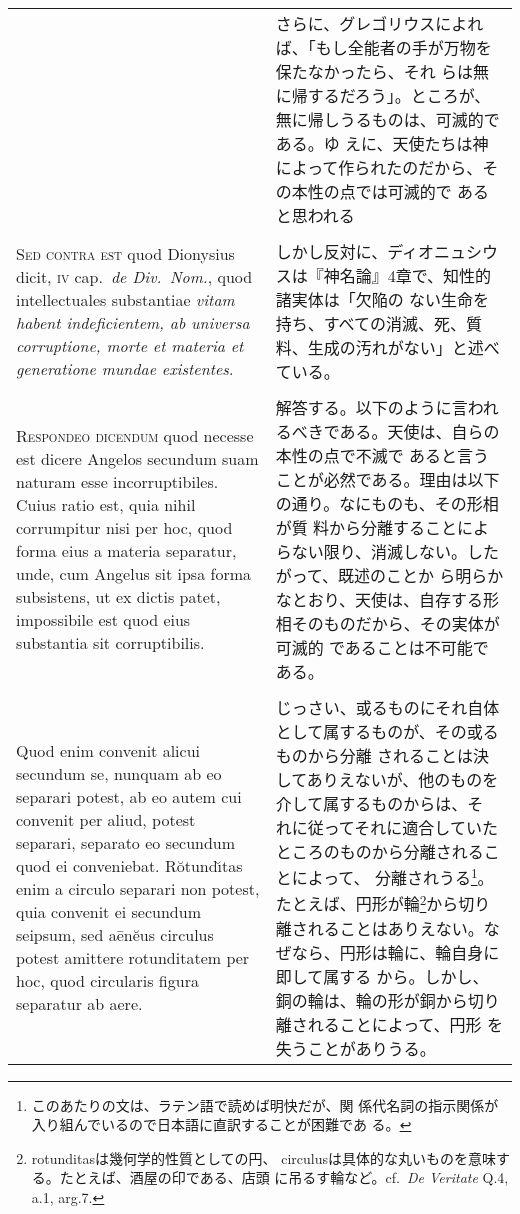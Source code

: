 \documentclass[10pt]{jsarticle} %
\begin{document}
\begin{longtable}{p{21em}p{21em}}
 &
 
さらに、グレゴリウスによれば、「もし全能者の手が万物を保たなかったら、それ
 らは無に帰するだろう」。ところが、無に帰しうるものは、可滅的である。ゆ
 えに、天使たちは神によって作られたのだから、その本性の点では可滅的で
 あると思われる

\\\\


{\scshape Sed contra est} quod Dionysius dicit, {\scshape iv}
cap.~{\itshape de Div.~Nom.}, quod intellectuales substantiae {\itshape
vitam habent indeficientem, ab universa corruptione, morte et materia et
generatione mundae existentes}.


 &
 
しかし反対に、ディオニュシウスは『神名論』4章で、知性的諸実体は「欠陥の
 ない生命を持ち、すべての消滅、死、質料、生成の汚れがない」と述べ
 ている。

\\\\


{\scshape Respondeo dicendum} quod necesse est dicere
Angelos secundum suam naturam esse incorruptibiles. Cuius ratio est,
quia nihil corrumpitur nisi per hoc, quod forma eius a materia
separatur, unde, cum Angelus sit ipsa forma subsistens, ut ex dictis
patet, impossibile est quod eius substantia sit corruptibilis. 


&

解答する。以下のように言われるべきである。天使は、自らの本性の点で不滅で
 あると言うことが必然である。理由は以下の通り。なにものも、その形相が質
 料から分離することによらない限り、消滅しない。したがって、既述のことか
 ら明らかなとおり、天使は、自存する形相そのものだから、その実体が可滅的
 であることは不可能である。


\\\\

Quod enim convenit alicui secundum se, nunquam ab eo separari potest,
ab eo autem cui convenit per aliud, potest separari, separato eo
secundum quod ei conveniebat. R\u{o}tund\u{\i}tas enim a circulo
separari non potest, quia convenit ei secundum seipsum, sed
a\={e}n\u{e}us circulus potest amittere rotunditatem per hoc, quod
circularis figura separatur ab aere.

&

 じっさい、或るものにそれ自体として属するものが、その或るものから分離
 されることは決してありえないが、他のものを介して属するものからは、そ
 れに従ってそれに適合していたところのものから分離されることによって、
 分離されうる\footnote{このあたりの文は、ラテン語で読めば明快だが、関
 係代名詞の指示関係が入り組んでいるので日本語に直訳することが困難であ
 る。}。たとえば、円形が輪\footnote{rotunditasは幾何学的性質としての円、
 circulusは具体的な丸いものを意味する。たとえば、酒屋の印である、店頭
 に吊るす輪など。cf.~{\itshape De Veritate} Q.4, a.1, arg.7.}から切り
 離されることはありえない。なぜなら、円形は輪に、輪自身に即して属する
 から。しかし、銅の輪は、輪の形が銅から切り離されることによって、円形
 を失うことがありうる。


\end{longtable}
\end{document}
